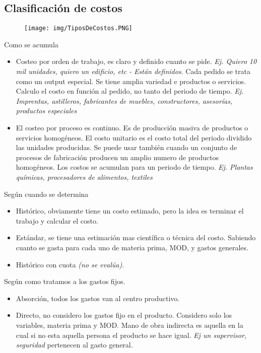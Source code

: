 \documentclass[titlepage,a4paper]{article}
\begin{document}
\subsection{Clasificación de costos}

\begin{figure}[!htb]
    \centering
    \texttt{[image: img/TiposDeCostos.PNG]}
\end{figure}

Como se acumula
\begin{itemize}
\item Costeo por orden de trabajo, es claro y definido cuanto se pide. \textit{Ej. Quiero 10 mil unidades, quiero un edificio, etc - Están definidos}. Cada pedido se trata como un output especial. Se tiene amplia variedad e productos o servicios. Calculo el costo en función al pedido, no tanto del periodo de tiempo. \textit{Ej. Imprentas, astilleros, fabricantes de muebles, constructores, asesorías, productos especiales}
\item El costeo por proceso es continuo. Es de producción masiva de productos o servicios homogéneos. El costo unitario es el costo total del periodo dividido las unidades producidas. Se puede usar también cuando un conjunto de procesos de fabricación producen un amplio numero de productos homogéneos. Los costos se acumulan para un periodo de tiempo. \textit{Ej. Plantas químicas, procesadores de alimentos, textiles}
\end{itemize}


Según cuando se determina
\begin{itemize}
\item Histórico, obviamente tiene un costo estimado, pero la idea es terminar el trabajo y calcular el costo.
\item Estándar, se tiene una estimación mas científica o técnica del costo. Sabiendo cuanto se gasta para cada uno de materia prima, MOD, y gastos generales.
\item Histórico con cuota \textit{(no se evalúa)}.
\end{itemize}


Según como tratamos a los gastos fijos.
\begin{itemize}
\item Absorción, todos los gastos van al centro productivo. 
\item Directo, no considero los gastos fijo en el producto. Considero solo los variables, materia prima y MOD. Mano de obra indirecta es aquella en la cual si no esta aquella persona el producto se hace igual. \textit{Ej un supervisor, seguridad} pertenecen al gasto general.
\end{itemize}
\end{document}
